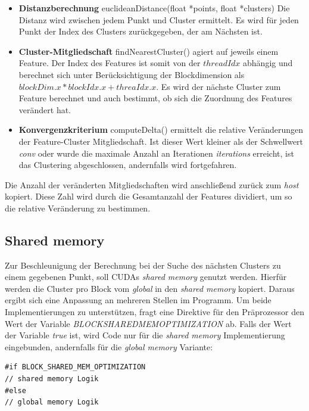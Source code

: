 \begin{itemize}
	\item \textbf{Distanzberechnung} euclideanDistance(float *points, float *clusters) Die Distanz wird zwischen jedem Punkt und Cluster ermittelt. Es wird für jeden Punkt der Index des Clusters zurückgegeben, der am Nächsten ist.
	\item \textbf{Cluster-Mitgliedschaft} findNearestCluster() agiert auf jeweils einem Feature. Der Index des Features ist somit von der $threadIdx$ abhängig und berechnet sich unter Berücksichtigung der Blockdimension als $blockDim.x * blockIdx.x + threaIdx.x$. Es wird der nächste Cluster zum Feature berechnet und auch bestimmt, ob sich die Zuordnung des Features verändert hat.
	\item \textbf{Konvergenzkriterium} computeDelta() ermittelt die relative Veränderungen der Feature-Cluster Mitgliedschaft. Ist dieser Wert kleiner als der Schwellwert \textit{conv} oder wurde die maximale Anzahl an Iterationen \textit{iterations} erreicht, ist das Clustering abgeschlossen, andernfalls wird fortgefahren.
\end{itemize}

Die Anzahl der veränderten Mitgliedschaften wird anschließend zurück zum \textit{host} kopiert. Diese Zahl wird durch die Gesamtanzahl der Features dividiert, um so die relative Veränderung zu bestimmen. 

\subsection{Shared memory}

Zur Beschleunigung der Berechnung bei der Suche des nächsten Clusters zu einem gegebenen Punkt, soll CUDAs \textit{shared memory} genutzt werden. Hierfür werden die Cluster pro Block vom \textit{global} in den \textit{shared memory} kopiert. Daraus ergibt sich eine Anpassung an mehreren Stellen im Programm. Um beide Implementierungen zu unterstützen, fragt eine Direktive für den Präprozessor den Wert der Variable \textit{BLOCK\textunderscore SHARED\textunderscore MEM\textunderscore OPTIMIZATION} ab. Falls der Wert der Variable \textit{true} ist, wird Code nur für die \textit{shared memory} Implementierung eingebunden, andernfalls für die \textit{global memory} Variante:

\lstset{language=C}
\begin{lstlisting}
#if BLOCK_SHARED_MEM_OPTIMIZATION
// shared memory Logik
#else
// global memory Logik
\end{lstlisting}

